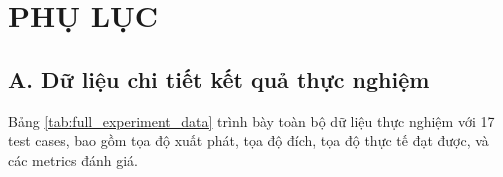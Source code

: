 
\chapter*{PHỤ LỤC}

\section*{A. Dữ liệu chi tiết kết quả thực nghiệm}

Bảng \ref{tab:full_experiment_data} trình bày toàn bộ dữ liệu thực nghiệm với 17 test cases, bao gồm tọa độ xuất phát, tọa độ đích, tọa độ thực tế đạt được, và các metrics đánh giá.

